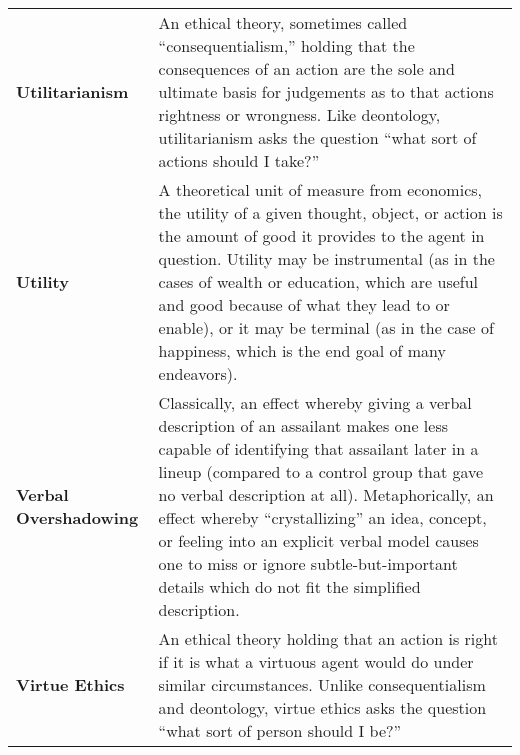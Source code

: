 \begin{longtable} { p{} p{} }
\textbf{Utilitarianism} & An ethical theory, sometimes called ``consequentialism,'' holding that the consequences of an action are the sole and ultimate basis for judgements as to that actions rightness or wrongness.  Like deontology, utilitarianism asks the question ``what sort of actions should I take?''\\

\textbf{Utility} & A theoretical unit of measure from economics, the utility of a given thought, object, or action is the amount of good it provides to the agent in question. Utility may be instrumental (as in the cases of wealth or education, which are useful and good because of what they lead to or enable), or it may be terminal (as in the case of happiness, which is the end goal of many endeavors).\\

\textbf{Verbal Overshadowing} & Classically, an effect whereby giving a verbal description of an assailant makes one less capable of identifying that assailant later in a lineup (compared to a control group that gave no verbal description at all).  Metaphorically, an effect whereby ``crystallizing'' an idea, concept, or feeling into an explicit verbal model causes one to miss or ignore subtle-but-important details which do not fit the simplified description.\\

\textbf{Virtue Ethics} & An ethical theory holding that an action is right if it is what a virtuous agent would do under similar circumstances.  Unlike consequentialism and deontology, virtue ethics asks the question ``what sort of person should I be?''\\

\end{longtable}
\clearpage



